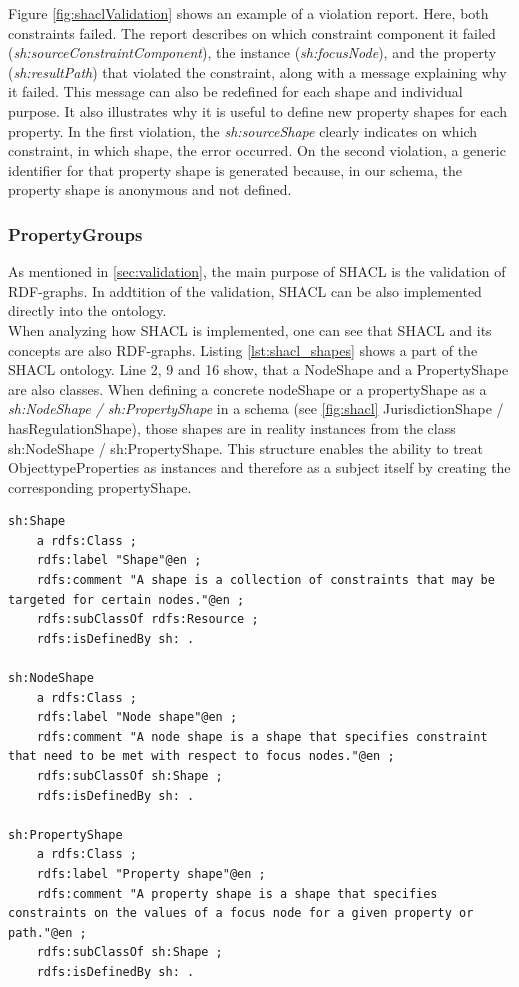 \documentclass[
  a4paper,  %
  twoside,  %
  bibliography=totoc,
  headsepline,
  cleardoublepage=empty,
  parskip=half,
  draft=false
]{scrbook}
\begin{document}
Figure \ref{fig:shaclValidation} shows an example of a violation report. Here, both constraints failed. The report describes on which constraint component it failed (\textit{sh:sourceConstraintComponent}), the instance (\textit{sh:focusNode}), and the property (\textit{sh:resultPath}) that violated the constraint, along with a message explaining why it failed. This message can also be redefined for each shape and individual purpose. It also illustrates why it is useful to define new property shapes for each property. In the first violation, the \textit{sh:sourceShape} clearly indicates on which constraint, in which shape, the error occurred. On the second violation, a generic identifier for that property shape is generated because, in our schema, the property shape is anonymous and not defined. 

\subsubsection{PropertyGroups}\label{sec:PropertyGroups}
As mentioned in \ref{sec:validation}, the main purpose of \acrshort{SHACL} is the validation of RDF-graphs. In addtition of the validation, \acrshort{SHACL} can be also implemented directly into the ontology.\\
When analyzing how \acrshort{SHACL} is implemented, one can see that SHACL and its concepts are also RDF-graphs. Listing \ref{lst:shacl_shapes} shows a part of the \acrshort{SHACL} ontology. Line 2, 9 and 16 show, that a NodeShape and a PropertyShape are also classes. When defining a concrete nodeShape or a propertyShape as a \textit{sh:NodeShape / sh:PropertyShape} in a schema (see \ref{fig:shacl} JurisdictionShape / hasRegulationShape), those shapes are in reality instances from the class sh:NodeShape / sh:PropertyShape. This structure enables the ability to treat ObjecttypeProperties as instances and therefore as a subject itself by creating the corresponding propertyShape. \\



\begin{lstlisting}[style=turtle, caption={SHACL shapes definition \cite{SHACL}}]
sh:Shape
	a rdfs:Class ;
	rdfs:label "Shape"@en ;
	rdfs:comment "A shape is a collection of constraints that may be targeted for certain nodes."@en ;
	rdfs:subClassOf rdfs:Resource ;
	rdfs:isDefinedBy sh: .

sh:NodeShape
	a rdfs:Class ;
	rdfs:label "Node shape"@en ;
	rdfs:comment "A node shape is a shape that specifies constraint that need to be met with respect to focus nodes."@en ;
	rdfs:subClassOf sh:Shape ;
	rdfs:isDefinedBy sh: .

sh:PropertyShape
	a rdfs:Class ;
	rdfs:label "Property shape"@en ;
	rdfs:comment "A property shape is a shape that specifies constraints on the values of a focus node for a given property or path."@en ;
	rdfs:subClassOf sh:Shape ;
	rdfs:isDefinedBy sh: .
\end{lstlisting}\label{lst:shacl_shapes}
\end{document}
